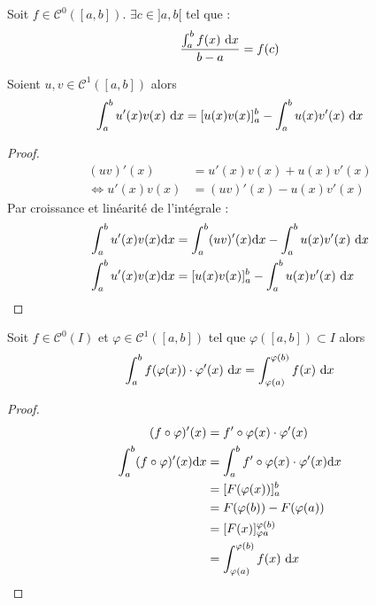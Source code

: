 \begin{theorem}
    Soit $f \in \mathcal{C}^0([a, b])$. $\exists c \in ]a, b[$  tel que :
    \[ \frac{\int_{a}^{b} f(x) \ \diffd x}{b - a} = f(c) \]
\end{theorem}

\begin{theorem}
	Soient $u, v \in \mathcal{C}^1([a, b])$ alors
	\begin{align*}
		\int_a^b u'(x) v(x) \ \diffd x = [u(x)v(x)]_a^b - \int_a^b u(x) v'(x) \ \diffd x
	\end{align*}
  \end{theorem}

\begin{proof}
    \begin{align*}
        (uv)'(x) &= u'(x) v(x) + u(x)v'(x) \\
        \iff u'(x)v(x) &= (uv)'(x) - u(x)v'(x)
    \end{align*}
    Par croissance et linéarité de l'intégrale :
    \begin{align*}
        \int_a^b u'(x)v(x) \diffd x &= \int_a^b (uv)'(x) \diffd x - \int_a^b u(x)v'(x) \ \diffd x \\
        \int_a^b u'(x)v(x) \diffd x &=  [u(x)v(x)]_a^b - \int_a^b u(x)v'(x) \ \diffd x 
    \end{align*}
\end{proof}

\begin{theorem}
	Soit $f \in \mathcal{C}^0(I)$ et $\varphi \in \mathcal{C}^1([a, b])$ tel que $\varphi ([a, b]) \subset I$ alors 
	\begin{align*}
		\int_a^b f(\varphi(x)) \cdot \varphi'(x) \ \diffd x = \int_{\varphi(a)}^{\varphi(b)} f(x) \ \diffd x
	\end{align*}
\end{theorem}

\begin{proof}
    \begin{align*}
        (f \circ \varphi)'(x) &= f' \circ \varphi(x) \cdot \varphi'(x) \\
        \int_a^b (f \circ \varphi)'(x) \diffd x &= \int_a^b f' \circ \varphi(x)  \cdot \varphi'(x) \diffd x \\
         &= [F(\varphi(x))]_a^b \\
         &= F(\varphi(b)) - F(\varphi(a)) \\
         &= [F(x)]_{\varphi{a}}^{\varphi(b)} \\
         &= \int_{\varphi(a)}^{\varphi(b)} f(x) \ \diffd x 
    \end{align*}
\end{proof}


